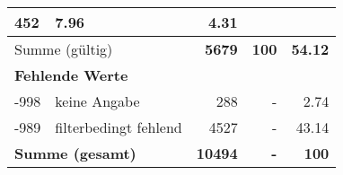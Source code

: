 \begin{longtable}{lXrrr}
       \num{452} &
       \num[round-mode=places,round-precision=2]{7.96} &
         \num[round-mode=places,round-precision=2]{4.31} \\
     \midrule
     \multicolumn{2}{l}{Summe (gültig)} &
       \textbf{\num{5679}} &
     \textbf{\num{100}} &
       \textbf{\num[round-mode=places,round-precision=2]{54.12}} \\
     \multicolumn{5}{l}{\textbf{Fehlende Werte}}\\
       -998 &
       keine Angabe &
         \num{288} &
        - &
         \num[round-mode=places,round-precision=2]{2.74} \\
       -989 &
       filterbedingt fehlend &
         \num{4527} &
        - &
         \num[round-mode=places,round-precision=2]{43.14} \\
     \midrule
     \multicolumn{2}{l}{\textbf{Summe (gesamt)}} &
          \textbf{\num{10494}} &
        \textbf{-} &
        \textbf{\num{100}} \\
     \bottomrule
     \end{longtable}
     
